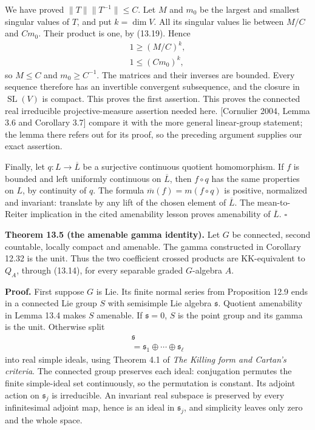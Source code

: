 \documentclass[
  11pt,
]{article}
\begin{document}
We have proved \(\|T\|\|T^{-1}\|\le C\). Let \(M\) and \(m_0\) be the
largest and smallest singular values of \(T\), and put \(k=\dim V\). All
its singular values lie between \(M/C\) and \(Cm_0\). Their product is
one, by (13.19). Hence \[
\begin{gathered}
1\ge(M/C)^k,\\
1\le(Cm_0)^k,
\end{gathered}
\tag{13.25}
\] so \(M\le C\) and \(m_0\ge C^{-1}\). The matrices and their inverses
are bounded. Every sequence therefore has an invertible convergent
subsequence, and the closure in \(\operatorname{SL}(V)\) is compact.
This proves the first assertion. This proves the connected real
irreducible projective-measure assertion needed here. {[}Cornulier 2004,
Lemma 3.6 and Corollary 3.7{]} compare it with the more general
linear-group statement; the lemma there refers out for its proof, so the
preceding argument supplies our exact assertion.

Finally, let \(q:L\to\overline L\) be a surjective continuous quotient
homomorphism. If \(f\) is bounded and left uniformly continuous on
\(\overline L\), then \(f\circ q\) has the same properties on \(L\), by
continuity of \(q\). The formula \(\overline m(f)=m(f\circ q)\) is
positive, normalized and invariant: translate by any lift of the chosen
element of \(\overline L\). The mean-to-Reiter implication in the cited
amenability lesson proves amenability of \(\overline L\). \(\square\)

\textbf{Theorem 13.5 (the amenable gamma identity).} Let \(G\) be
connected, second countable, locally compact and amenable. The gamma
constructed in Corollary 12.32 is the unit. Thus the two coefficient
crossed products are KK-equivalent to \(Q_A\), through (13.14), for
every separable graded \(G\)-algebra \(A\).

\textbf{Proof.} First suppose \(G\) is Lie. Its finite normal series
from Proposition 12.9 ends in a connected Lie group \(S\) with
semisimple Lie algebra \(\mathfrak s\). Quotient amenability in Lemma
13.4 makes \(S\) amenable. If \(\mathfrak s=0\), \(S\) is the point
group and its gamma is the unit. Otherwise split \[
\begin{gathered}
\mathfrak s\\
=\mathfrak s_1\oplus\cdots\oplus\mathfrak s_\ell
\end{gathered}
\tag{13.26}
\] into real simple ideals, using Theorem 4.1 of \emph{The Killing form
and Cartan's criteria}. The connected group preserves each ideal:
conjugation permutes the finite simple-ideal set continuously, so the
permutation is constant. Its adjoint action on \(\mathfrak s_j\) is
irreducible. An invariant real subspace is preserved by every
infinitesimal adjoint map, hence is an ideal in \(\mathfrak s_j\), and
simplicity leaves only zero and the whole space.
\end{document}
